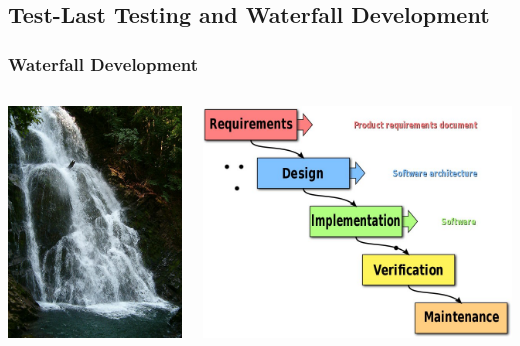 \documentclass{beamer}
\begin{document}
\subsection{Test-Last Testing and Waterfall Development}

\begin{frame}
\frametitle{Waterfall Development}
\begin{columns}
\begin{column}{.4\textwidth}
\includegraphics[scale=.25]{Waterfall.JPG}
\\
\end{column}
\begin{column}{0.6\textwidth}
\includegraphics[scale=.3]{Waterfall_model.jpg}

\end{column}
\end{columns}
\end{frame}
\end{document}
